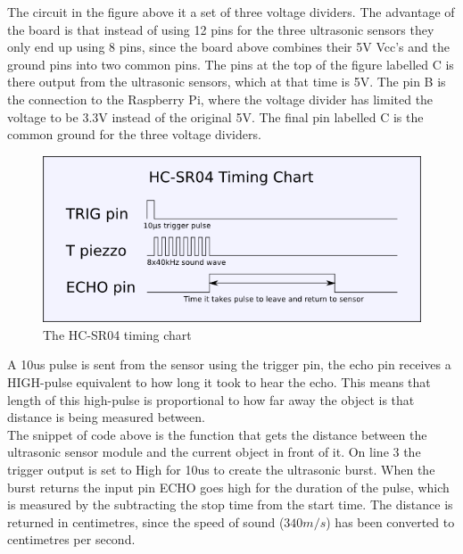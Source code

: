 The circuit in the figure above it a set of three voltage dividers. The advantage of the board is that instead of using 12 pins for the three ultrasonic sensors they only end up using 8 pins, since the board above combines their 5V Vcc's and the ground pins into two common pins.  
The pins at the top of the figure labelled C is there output from the ultrasonic sensors, which at that time is 5V. The pin B is the connection to the Raspberry Pi, where the voltage divider has limited the voltage to be 3.3V instead of the original 5V.  
The final pin labelled C is the common ground for the three voltage dividers.

\begin{figure}[H]
	\centering
	\includegraphics[width=.5\linewidth]{images/hcsr04timingchart.png}
	\caption{The HC-SR04 timing chart\cite{hcsr04timingchart}}
\end{figure}

A 10us pulse is sent from the sensor using the trigger pin, the echo pin receives a HIGH-pulse equivalent to how long it took to hear the echo. This means that length of this high-pulse is proportional to how far away the object is that distance is being measured between.\cite{ultrasonichowitworks}\\




The snippet of code above is the function that gets the distance between the ultrasonic sensor module and the current object in front of it.
On line 3 the trigger output is set to High for 10us to create the ultrasonic burst. When the burst returns the input pin ECHO goes high for the duration of the pulse, which is measured by the subtracting the stop time from the start time.
The distance is returned in centimetres, since the speed of sound ($340m/s$) has been converted to centimetres per second.